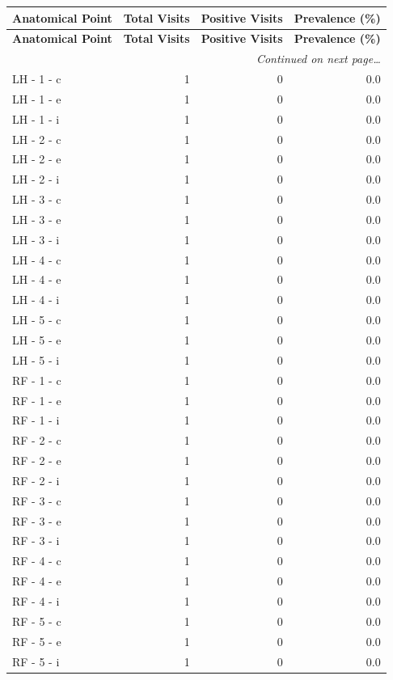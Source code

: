 \documentclass[a4paper,11pt]{article}
\begin{document}
\begin{small}
\begin{longtable}{p{5cm}rrr}
\toprule
\textbf{Anatomical Point} &
\textbf{Total Visits} &
\textbf{Positive Visits} &
\textbf{Prevalence (\%)} \\
\midrule
\endfirsthead
\toprule
\textbf{Anatomical Point} &
\textbf{Total Visits} &
\textbf{Positive Visits} &
\textbf{Prevalence (\%)} \\
\midrule
\endhead
\midrule
\multicolumn{4}{r}{\small\emph{Continued on next page\ldots}} \\
\endfoot
\bottomrule
\endlastfoot
LH - 1 - c & 1 & 0 & 0.0 \\
LH - 1 - e & 1 & 0 & 0.0 \\
LH - 1 - i & 1 & 0 & 0.0 \\
LH - 2 - c & 1 & 0 & 0.0 \\
LH - 2 - e & 1 & 0 & 0.0 \\
LH - 2 - i & 1 & 0 & 0.0 \\
LH - 3 - c & 1 & 0 & 0.0 \\
LH - 3 - e & 1 & 0 & 0.0 \\
LH - 3 - i & 1 & 0 & 0.0 \\
LH - 4 - c & 1 & 0 & 0.0 \\
LH - 4 - e & 1 & 0 & 0.0 \\
LH - 4 - i & 1 & 0 & 0.0 \\
LH - 5 - c & 1 & 0 & 0.0 \\
LH - 5 - e & 1 & 0 & 0.0 \\
LH - 5 - i & 1 & 0 & 0.0 \\
RF - 1 - c & 1 & 0 & 0.0 \\
RF - 1 - e & 1 & 0 & 0.0 \\
RF - 1 - i & 1 & 0 & 0.0 \\
RF - 2 - c & 1 & 0 & 0.0 \\
RF - 2 - e & 1 & 0 & 0.0 \\
RF - 2 - i & 1 & 0 & 0.0 \\
RF - 3 - c & 1 & 0 & 0.0 \\
RF - 3 - e & 1 & 0 & 0.0 \\
RF - 3 - i & 1 & 0 & 0.0 \\
RF - 4 - c & 1 & 0 & 0.0 \\
RF - 4 - e & 1 & 0 & 0.0 \\
RF - 4 - i & 1 & 0 & 0.0 \\
RF - 5 - c & 1 & 0 & 0.0 \\
RF - 5 - e & 1 & 0 & 0.0 \\
RF - 5 - i & 1 & 0 & 0.0 \\

\end{longtable}
\end{small}
\end{document}
